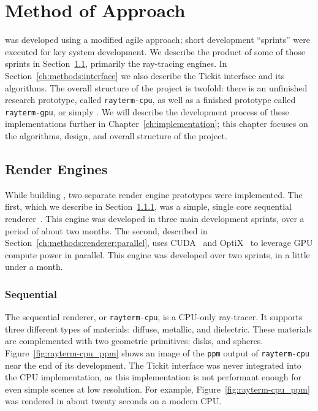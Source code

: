 %
%
%
\chapter{Method of Approach} \label{ch:methods}

 \name{} was developed using a modified agile approach; short development ``sprints'' were executed for key system development.
We describe the product of some of those sprints in Section~\ref{ch:methods:renderer}, primarily the ray-tracing engines.
In Section~\ref{ch:methods:interface} we also describe the Tickit interface and its algorithms.
The overall structure of the project is twofold: there is an unfinished research prototype, called \texttt{rayterm-cpu}, as well as a finished prototype called \texttt{rayterm-gpu}, or simply \name{}.
We will describe the development process of these implementations further in Chapter~\ref{ch:implementation}; this chapter focuses on the algorithms, design, and overall structure of the project.


\section{Render Engines} \label{ch:methods:renderer}
While building \name{}, two separate render engine prototypes were implemented.
The first, which we describe in Section~\ref{ch:methods:renderer:sequential}, was a simple, single core sequential renderer~\cite{raytermCpuImpl}.
This engine was developed in three main development sprints, over a period of about two months.
The second, described in Section~\ref{ch:methods:renderer:parallel}, uses CUDA~\cite{nvidia2011cuda} and OptiX~\cite{parker2010optix} to leverage GPU compute power in parallel.
This engine was developed over two sprints, in a little under a month.


\subsection{Sequential} \label{ch:methods:renderer:sequential}

The sequential renderer, or \texttt{rayterm-cpu}, is a CPU-only ray-tracer.
It supports three different types of materials: diffuse, metallic, and dielectric.
These materials are complemented with two geometric primitives: disks, and spheres.
Figure~\ref{fig:rayterm-cpu_ppm} shows an image of the \texttt{ppm} output of \texttt{rayterm-cpu} near the end of its development.
The Tickit interface was never integrated into the CPU implementation, as this implementation is not performant enough for even simple scenes at low resolution.
For example, Figure~\ref{fig:rayterm-cpu_ppm} was rendered in about twenty seconds on a modern CPU.

